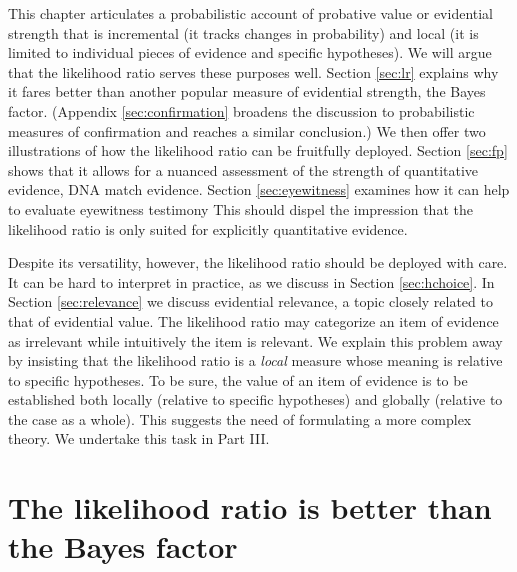 \documentclass[
  letterpaper,
  DIV=11,
  numbers=noendperiod]{scrartcl}
\begin{document}
This chapter articulates a probabilistic account of probative value or
evidential strength that is incremental (it tracks changes in
probability) and local (it is limited to individual pieces of evidence
and specific hypotheses). We will argue that the likelihood ratio serves
these purposes well. Section \ref{sec:lr} explains why it fares better
than another popular measure of evidential strength, the Bayes factor.
(Appendix \ref{sec:confirmation} broadens the discussion to
probabilistic measures of confirmation and reaches a similar
conclusion.) We then offer two illustrations of how the likelihood ratio
can be fruitfully deployed. Section \ref{sec:fp} shows that it allows
for a nuanced assessment of the strength of quantitative evidence, DNA
match evidence. Section \ref{sec:eyewitness} examines how it can help to
evaluate eyewitness testimony This should dispel the impression that the
likelihood ratio is only suited for explicitly quantitative evidence.

Despite its versatility, however, the likelihood ratio should be
deployed with care. It can be hard to interpret in practice, as we
discuss in Section \ref{sec:hchoice}. In Section \ref{sec:relevance} we
discuss evidential relevance, a topic closely related to that of
evidential value. The likelihood ratio may categorize an item of
evidence as irrelevant while intuitively the item is relevant. We
explain this problem away by insisting that the likelihood ratio is a
\textit{local} measure whose meaning is relative to specific hypotheses.
To be sure, the value of an item of evidence is to be established both
locally (relative to specific hypotheses) and globally (relative to the
case as a whole). This suggests the need of formulating a more complex
theory. We undertake this task in Part III.

\hypertarget{the-likelihood-ratio-is-better-than-the-bayes-factor}{%
\section{The likelihood ratio is better than the Bayes
factor}\label{the-likelihood-ratio-is-better-than-the-bayes-factor}}

\label{sec:lr}
\end{document}
